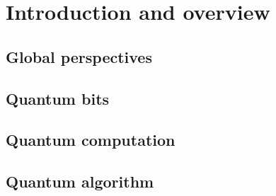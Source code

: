 \documentclass[en]{sol-man}
\begin{document}
\fi
\chapter{Introduction and overview}

\section{Global perspectives}

\section{Quantum bits}

\section{Quantum computation}

\section{Quantum algorithm}
\end{document}
